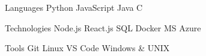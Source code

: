 

\begin{cvskills}

  \cvskill
  {Languages} %
  {
    Python
      {\enskip\cdotp\enskip} JavaScript
      {\enskip\cdotp\enskip} Java
      {\enskip\cdotp\enskip} C
  } %

  \cvskill
  {Technologies} %
  {
    Node.js
      {\enskip\cdotp\enskip} React.js
      {\enskip\cdotp\enskip} SQL
      {\enskip\cdotp\enskip} Docker
      {\enskip\cdotp\enskip} MS Azure
  } %

  \cvskill
  {Tools} %
  {
    Git
      {\enskip\cdotp\enskip} Linux
      {\enskip\cdotp\enskip} VS Code
      {\enskip\cdotp\enskip} Windows \& UNIX
  } %


\end{cvskills}
